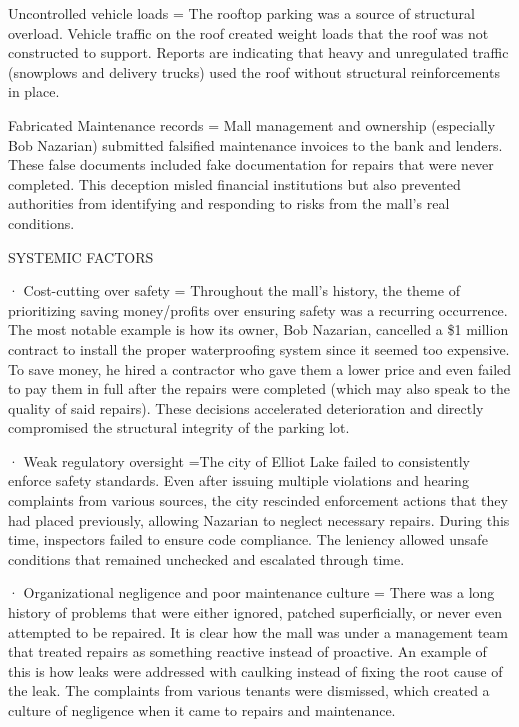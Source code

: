 \documentclass[12pt]{article}
\begin{document}
 

 

 
Uncontrolled vehicle loads = The rooftop parking was a source of structural overload. Vehicle traffic on the roof created weight loads that the roof was not constructed to support. Reports are indicating that heavy and unregulated traffic (snowplows and delivery trucks) used the roof without structural reinforcements in place. 

 

 
Fabricated Maintenance records = Mall management and ownership (especially Bob Nazarian) submitted falsified maintenance invoices to the bank and lenders. These false documents included fake documentation for repairs that were never completed. This deception misled financial institutions but also prevented authorities from identifying and responding to risks from the mall's real conditions. 


SYSTEMIC FACTORS

· Cost-cutting over safety = Throughout the mall's history, the theme of prioritizing saving money/profits over ensuring safety was a recurring occurrence. The most notable example is how its owner, Bob Nazarian, cancelled a \$1 million contract to install the proper waterproofing system since it seemed too expensive. To save money, he hired a contractor who gave them a lower price and even failed to pay them in full after the repairs were completed (which may also speak to the quality of said repairs). These decisions accelerated deterioration and directly compromised the structural integrity of the parking lot. 

 

 · Weak regulatory oversight =The city of Elliot Lake failed to consistently enforce safety standards. Even after issuing multiple violations and hearing complaints from various sources, the city rescinded enforcement actions that they had placed previously, allowing Nazarian to neglect necessary repairs. During this time, inspectors failed to ensure code compliance. The leniency allowed unsafe conditions that remained unchecked and escalated through time. 

 

 · Organizational negligence and poor maintenance culture = There was a long history of problems that were either ignored, patched superficially, or never even attempted to be repaired. It is clear how the mall was under a management team that treated repairs as something reactive instead of proactive. An example of this is how leaks were addressed with caulking instead of fixing the root cause of the leak. The complaints from various tenants were dismissed, which created a culture of negligence when it came to repairs and maintenance. 
\end{document}
